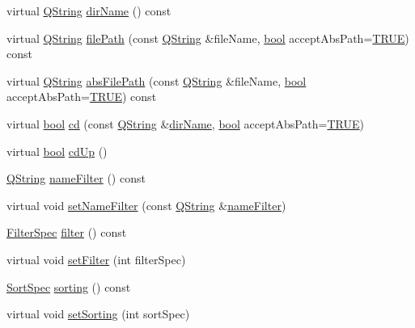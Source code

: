 \begin{DoxyCompactItemize}
\item 
virtual \hyperlink{class_q_string}{Q\+String} \hyperlink{class_q_dir_a12b679447f94f6eb194ec9bfb2a6d8a4}{dir\+Name} () const 
\item 
virtual \hyperlink{class_q_string}{Q\+String} \hyperlink{class_q_dir_a5a94f451c6a1a268228878b1add20bf0}{file\+Path} (const \hyperlink{class_q_string}{Q\+String} \&file\+Name, \hyperlink{qglobal_8h_a1062901a7428fdd9c7f180f5e01ea056}{bool} accept\+Abs\+Path=\hyperlink{qglobal_8h_a04a6422a52070f0dc478693da640242b}{T\+R\+U\+E}) const 
\item 
virtual \hyperlink{class_q_string}{Q\+String} \hyperlink{class_q_dir_af85dfc097c27c98c2f96bff380530970}{abs\+File\+Path} (const \hyperlink{class_q_string}{Q\+String} \&file\+Name, \hyperlink{qglobal_8h_a1062901a7428fdd9c7f180f5e01ea056}{bool} accept\+Abs\+Path=\hyperlink{qglobal_8h_a04a6422a52070f0dc478693da640242b}{T\+R\+U\+E}) const 
\item 
virtual \hyperlink{qglobal_8h_a1062901a7428fdd9c7f180f5e01ea056}{bool} \hyperlink{class_q_dir_a5a58d7a5387627fa479f2ac376895e6a}{cd} (const \hyperlink{class_q_string}{Q\+String} \&\hyperlink{class_q_dir_a12b679447f94f6eb194ec9bfb2a6d8a4}{dir\+Name}, \hyperlink{qglobal_8h_a1062901a7428fdd9c7f180f5e01ea056}{bool} accept\+Abs\+Path=\hyperlink{qglobal_8h_a04a6422a52070f0dc478693da640242b}{T\+R\+U\+E})
\item 
virtual \hyperlink{qglobal_8h_a1062901a7428fdd9c7f180f5e01ea056}{bool} \hyperlink{class_q_dir_a22a212babdfa332de6ee9d07f96dc2ba}{cd\+Up} ()
\item 
\hyperlink{class_q_string}{Q\+String} \hyperlink{class_q_dir_a8d501954ccb9e48d8e675c85c60ec57a}{name\+Filter} () const 
\item 
virtual void \hyperlink{class_q_dir_a26b95e183a9ba9410219a3ce4d8c3416}{set\+Name\+Filter} (const \hyperlink{class_q_string}{Q\+String} \&\hyperlink{class_q_dir_a8d501954ccb9e48d8e675c85c60ec57a}{name\+Filter})
\item 
\hyperlink{class_q_dir_a8b8c5b4f0028081f094c85129b8cc8b1}{Filter\+Spec} \hyperlink{class_q_dir_a987d4eb30710296adf551c2b48118b28}{filter} () const 
\item 
virtual void \hyperlink{class_q_dir_a68d9e723870b5f8226353dc6047a35ee}{set\+Filter} (int filter\+Spec)
\item 
\hyperlink{class_q_dir_a428a858abe9593efc498b6641b41994c}{Sort\+Spec} \hyperlink{class_q_dir_a49f5647b906fb9eb358a84bbc2e213c3}{sorting} () const 
\item 
virtual void \hyperlink{class_q_dir_a65280d204cd65975953e3eb2a63da778}{set\+Sorting} (int sort\+Spec)

\end{DoxyCompactItemize}
